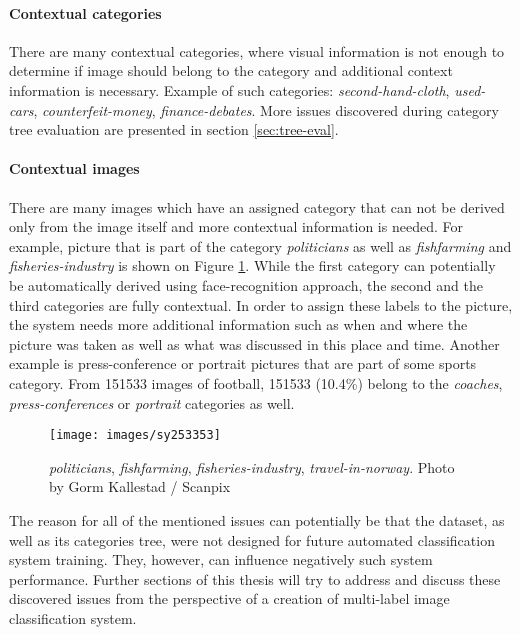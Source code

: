 \paragraph{Contextual categories}
There are many contextual categories, where visual information is not enough to determine if image should belong to the category and additional context information is necessary. Example of such categories: \textit{second-hand-cloth}, \textit{used-cars}, \textit{counterfeit-money}, \textit{finance-debates}. More issues discovered during category tree evaluation are presented in section \ref{sec:tree-eval}.

\paragraph{Contextual images}
There are many images which have an assigned category that can not be derived only from the image itself and more contextual information is needed. For example, picture that is part of the category \textit{politicians} as well as \textit{fishfarming} and \textit{fisheries-industry} is shown on Figure \ref{fig:politician-fish}. While the first category can potentially be automatically derived using face-recognition approach, the second and the third categories are fully contextual. In order to assign these labels to the picture, the system needs more additional information such as when and where the picture was taken as well as what was discussed in this place and time. Another example is press-conference or portrait pictures that are part of some sports category. From 151533 images of football, 151533 (10.4\%) belong to the \textit{coaches}, \textit{press-conferences} or \textit{portrait} categories as well.

\begin{figure}[h]
    \centering
    \texttt{[image: images/sy253353]}
    \caption[Example of contextual labeled images]{\textit{politicians}, \textit{fishfarming}, \textit{fisheries-industry}, \textit{travel-in-norway}. Photo by Gorm Kallestad / Scanpix}
    \label{fig:politician-fish}
\end{figure}

The reason for all of the mentioned issues can potentially be that the dataset, as well as its categories tree, were not designed for future automated classification system training. They, however, can influence negatively such system performance. Further sections of this thesis will try to address and discuss these discovered issues from the perspective of a creation of multi-label image classification system.

